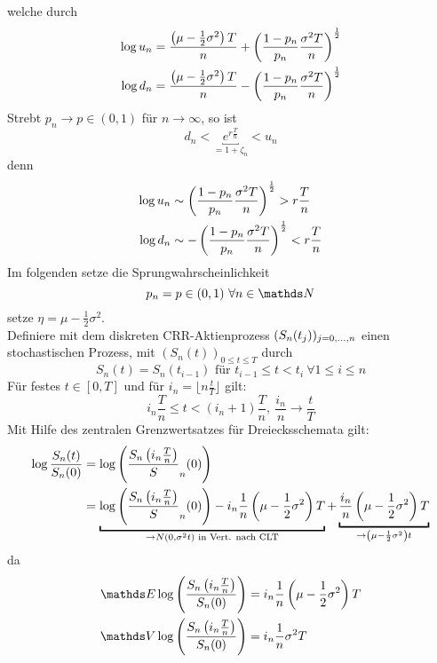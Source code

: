 welche durch
\begin{equation*}
\begin{aligned}
	\log u_n &= \frac{\left( \mu-\frac{1}{2}\sigma^2\right)T}{n}+\left( \frac{1-p_n}{p_n}\frac{\sigma^2T}{n}\right)^{\frac{1}{2}}\\
	\log d_n &= \frac{\left( \mu-\frac{1}{2}\sigma^2\right)T}{n}-\left( \frac{1-p_n}{p_n}\frac{\sigma^2T}{n}\right)^{\frac{1}{2}}
\end{aligned}
\end{equation*}
Strebt $p_n\to p\in (0,1)$ für $n\to \infty$, so ist
\[
d_n<\underbracket{e^{r\frac{T}{n}}}_{=1+\zeta_n}< u_n
\]
denn 
\begin{equation*}
\begin{aligned}
	\log u_n &\sim \left( \frac{1-p_n}{p_n}\frac{\sigma^2T}{n}\right)^{\frac{1}{2}}>r\frac{T}{n}\\
	\log d_n &\sim -\left( \frac{1-p_n}{p_n}\frac{\sigma^2T}{n}\right)^{\frac{1}{2}}<r\frac{T}{n}
\end{aligned}
\end{equation*}
Im folgenden setze die Sprungwahrscheinlichkeit
\[
p_n=p\in (0,1)~\forall n\in \N
\]
setze $\eta=\mu-\frac{1}{2}\sigma^2$.\\
Definiere mit dem diskreten CRR-Aktienprozess $(S_n(t_j))_{j=0, \dots ,n}$ einen stochastischen Prozess, mit $(S_n(t))_{0\le t\le T}$ durch
\[
S_n(t)=S_n(t_{i-1})\text{ für } t_{i-1}\le t<t_i~\forall 1\le i\le n
\]
Für festes $t\in[0,T]$ und für $i_n=\lfloor n\frac{t}{T}\rfloor$ gilt:
\[
i_n\frac{T}{n}\le t<(i_n+1)\frac{T}{n},~\frac{i_n}{n}\to \frac{t}{T}
\]
Mit Hilfe des zentralen Grenzwertsatzes für Dreiecksschemata gilt:
\begin{equation*}
\begin{aligned}
	\log\frac{S_n(t)}{S_n(0)} &= \log\enbrace{\frac{S_n\enbrace{i_n\frac{T}{n}}}S_n(0)}\\
	&=\underbracket{\log\enbrace{\frac{S_n\enbrace{i_n\frac{T}{n}}}S_n(0)}-i_n\frac{1}{n}\enbrace{\mu-\frac{1}{2}\sigma^2}T}_{\to N(0,\sigma^2t)\text{ in Vert. nach CLT}}+\underbracket{\frac{i_n}{n}\enbrace{\mu-\frac{1}{2}\sigma^2}T}_{\to \enbrace{\mu-\frac{1}{2}\sigma^2}t}
\end{aligned}
\end{equation*}
da
\begin{equation*}
\begin{aligned}
	\E\log\enbrace{\frac{S_n\enbrace{i_n\frac{T}{n}}}{S_n(0)}}&= i_n\frac{1}{n}\enbrace{\mu-\frac{1}{2}\sigma^2}T\\
	\V\log\enbrace{\frac{S_n\enbrace{i_n\frac{T}{n}}}{S_n(0)}}&= i_n\frac{1}{n}\sigma^2T
\end{aligned}
\end{equation*}
